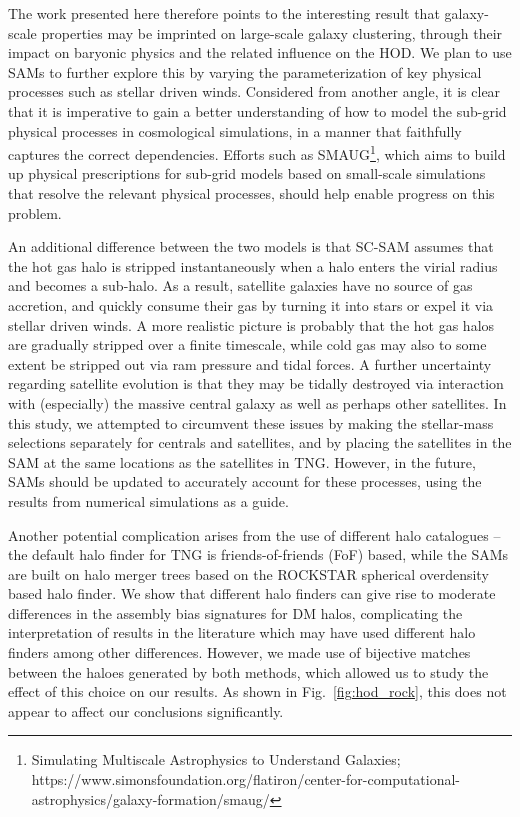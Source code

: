\documentclass[fleqn,usenatbib]{mnras}
\begin{document}
The work presented here therefore points to the interesting result that galaxy-scale properties may be imprinted on large-scale galaxy clustering, through their impact on baryonic physics and the related influence on the HOD. We plan to use SAMs to further explore this by varying the parameterization of key physical processes such as stellar driven winds. Considered from another angle, it is clear that it is imperative to gain a better understanding of how to model the sub-grid physical processes in cosmological simulations, in a manner that faithfully captures the correct dependencies. Efforts such as SMAUG\footnote{Simulating Multiscale Astrophysics to Understand Galaxies; https://www.simonsfoundation.org/flatiron/center-for-computational-astrophysics/galaxy-formation/smaug/}, which aims to build up physical prescriptions for sub-grid models based on small-scale simulations that resolve the relevant physical processes, should help enable progress on this problem. 

An additional difference between the two models is that SC-SAM assumes that the hot gas halo is stripped instantaneously when a halo enters the virial radius and becomes a sub-halo. As a result, satellite galaxies have no source of gas accretion, and quickly consume their gas by turning it into stars or expel it via stellar driven winds. A more realistic picture is probably that the hot gas halos are gradually stripped over a finite timescale, while cold gas may also to some extent be stripped out via ram pressure and tidal forces. A further uncertainty regarding satellite evolution is that they may be tidally destroyed via interaction with (especially) the massive central galaxy as well as perhaps other satellites. In this study, we attempted to circumvent these issues by making the stellar-mass selections separately for centrals and satellites, and by placing the satellites in the SAM at the same locations as the satellites in TNG. However, in the future, SAMs should be updated to accurately account for these processes, using the results from numerical simulations as a guide. 

Another potential complication arises from the use of different halo catalogues -- the default halo finder for TNG is friends-of-friends (FoF) based, while the SAMs are built on halo merger trees based on the \textsc{ROCKSTAR} spherical overdensity based halo finder. We show that different halo finders can give rise to moderate differences in the assembly bias signatures for DM halos, complicating the interpretation of results in the literature which may have used different halo finders among other differences. However, we made use of bijective matches between the haloes generated by both methods, which allowed us to study the effect of this choice on our results. As shown in Fig.~\ref{fig:hod_rock}, this does not appear to affect our conclusions significantly.
\end{document}
